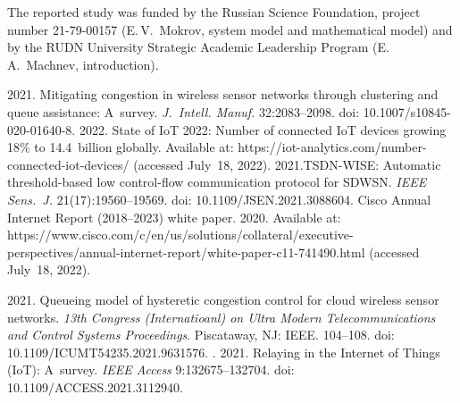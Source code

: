 




\vspace*{-16pt}

\Ack
\noindent
The reported study was funded by the Russian Science Foundation, project number 21-79-00157 (E.\,V.~Mokrov, system model 
and mathematical model) and by the RUDN University Strategic Academic Leadership Program 
(E.\,A.~Machnev, introduction). 




  \begin{multicols}{2}

\renewcommand{\bibname}{\protect\rmfamily References}

{\small\frenchspacing
 {%
 \begin{thebibliography}{9}
 2021. Mitigating congestion in wireless sensor networks 
through clustering and queue assistance: A~survey. \textit{J.~Intell. Manuf.}  
32:2083--2098. doi: 10.1007/s10845-020-01640-8.
 2022.
State of IoT 2022: Number of connected IoT devices growing 18\% to 14.4~billion globally. Available 
at: {\sf https://iot-analytics.com/number-connected-iot-devices/} (accessed July~18, 2022).
 2021.TSDN-WISE: Automatic threshold-based low  
control-flow communication protocol for SDWSN. \textit{IEEE Sens.~J.} 21(17):19560--19569. doi: 
10.1109/JSEN.2021.3088604.
Cisco Annual Internet Report (2018--2023) white paper. 2020. Available at: {\sf 
https://www.cisco.com/c/en/us/\linebreak solutions/collateral/executive-perspectives/annual-internet-report/white-paper-c11-741490.html} 
(accessed July~18, 2022).

 2021. Queueing model of hysteretic congestion control 
for cloud wireless sensor networks. \textit{13th Congress (Internatioanl) on Ultra Modern 
Telecommunications and Control Systems Proceedings}. Piscataway, NJ: IEEE. 104--108. doi: 
10.1109/ICUMT54235.2021.9631576.
. 2021. Relaying in the Internet of Things (IoT): 
A~survey. \textit{IEEE Access} 9:132675--132704. doi: 10.1109/ACCESS.2021.3112940.


\end{thebibliography}}}
\end{multicols}
